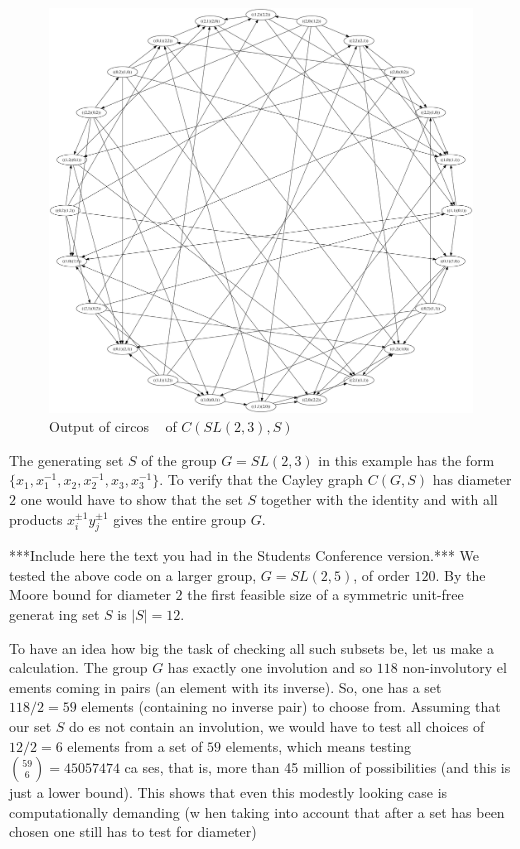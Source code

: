 \documentclass[a4paper,12pt,oneside]{report}%
\begin{document}
\begin{figure}[!ht]
	\centering
	\includegraphics[scale=0.25]{example.png}
	\caption{ Output of circos ~\cite{Circos} of $C(SL(2,3), S)$ }
\end{figure}

The generating set $S$ of the group $G=SL(2,3)$ in this example has the form $\{ x_1,x_1^{-1},x_2,x_2^{-1},x_3,x_3^{-1}\}$. To verify that the Cayley graph $C(G,S)$ has diameter $2$ one would have to show that the set $S$ together with the identity and with all products $x_i^{\pm 1}y_j^{\pm 1}$ gives the entire group $G$.

***Include here the text you had in the Students Conference version.***
We tested the above code on a larger group, $G=SL(2,5)$, of order $120$. By the Moore bound for diameter $2$ the first feasible size of a symmetric unit-free generat    ing set $S$ is $|S|=12$.
 
To have an idea how big the task of checking all such subsets be, let us make a calculation. The group $G$ has exactly one involution and so $118$ non-involutory el    ements coming in pairs (an element with its inverse). So, one has a set $118/2=59$ elements (containing no inverse pair) to choose from. Assuming that our set $S$ do    es not contain an involution, we would have to test all choices of $12/2=6$ elements from a set of $59$ elements, which means testing ${59 \choose 6} = 45057474 $ ca    ses, that is, more than 45 million of possibilities (and this is just a lower bound). This shows that even this modestly looking case is computationally demanding (w    hen taking into account that after a set has been chosen one still has to test for diameter)
\end{document}
